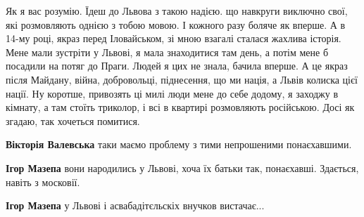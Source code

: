 \begin{itemize}
 

Як я вас розумію. Їдеш до Львова з такою надією. що навкруги виключно свої, які
розмовляють однією з тобою мовою. І кожного разу боляче як вперше. А в 14-му
році, якраз перед Іловайськом, зі мною взагалі сталася жахлива історія. Мене
мали зустріти у Львові, я мала знаходитися там день, а потім мене б посадили на
потяг до Праги. Людей я цих не знала, бачила вперше. А це якраз після Майдану,
війна, добровольці, піднесення, що ми нація, а Львів колиска цієї нації. Ну
коротше, привозять ці милі люди мене до себе додому, я заходжу в кімнату, а там
стоїть триколор, і всі в квартирі розмовляють російською. Досі як згадаю, так
хочеться помитися.

\begin{itemize}
 
\textbf{Вікторія Валевська} таки маємо проблему з тими непрошеними понаєхавшими.

 
\textbf{Ігор Мазепа} вони народились у Львові, хоча їх батьки так, понаєхавші. Здається, навіть з московії.

 
\textbf{Ігор Мазепа} у Львові і асвабадітєльскіх внучков вистачає...

 

\end{itemize}
\end{itemize}
